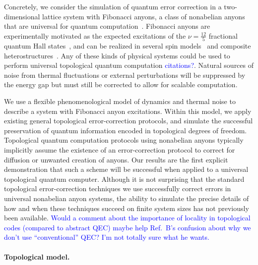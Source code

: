 \documentclass[aps, prl, letterpaper, twocolumn, superscriptaddress, notitlepage, 10pt]{revtex4-1}
\newcommand{\cggb}[1]{\textcolor{blue}{#1}}
\begin{document}
Concretely, we consider the simulation of quantum error correction in a two-dimensional lattice 
system with Fibonacci anyons, a class of nonabelian anyons that are universal for quantum 
computation~\cite{Freedman2002, Nayak2008}. Fibonacci anyons are experimentally motivated as the 
expected excitations of the $\nu=\frac{12}{5}$ fractional quantum Hall 
states~\cite{Slingerland2001}, and can be realized in several spin 
models~\cite{Levin2005, Bonesteel2012, Kapit2013, Palumbo2014} and composite 
heterostructures~\cite{Mong2014}.
Any of these kinds of physical systems could be used to perform universal topological quantum computation \cggb{citations?}. Natural sources of noise from thermal fluctuations or external perturbations will be suppressed by the energy gap but must still be corrected to allow for scalable computation.

We use a flexible phenomenological model of dynamics and thermal 
noise to describe a system with Fibonacci anyon excitations. Within 
this model, we apply existing general topological error-correction protocols, and 
simulate the successful preservation of quantum information encoded in topological 
degrees of freedom. Topological quantum computation protocols using nonabelian anyons 
typically implicitly assume the existence of an error-correction protocol to 
correct for diffusion or unwanted creation of anyons. Our results 
are the first explicit demonstration that such a scheme will 
be successful when applied to a universal topological quantum computer.
Although it is not surprising that the standard topological error-correction techniques we use successfully correct errors in universal nonabelian anyon systems, the ability to simulate the precise details of how and when these techniques succeed on finite system sizes has not previously been available. \cggb{Would a comment about the importance of locality in topological codes (compared to abstract QEC) maybe help Ref.~B's confusion about why we don't use ``conventional'' QEC? I'm not totally sure what he wants.}


\paragraph{Topological model.}
\end{document}
